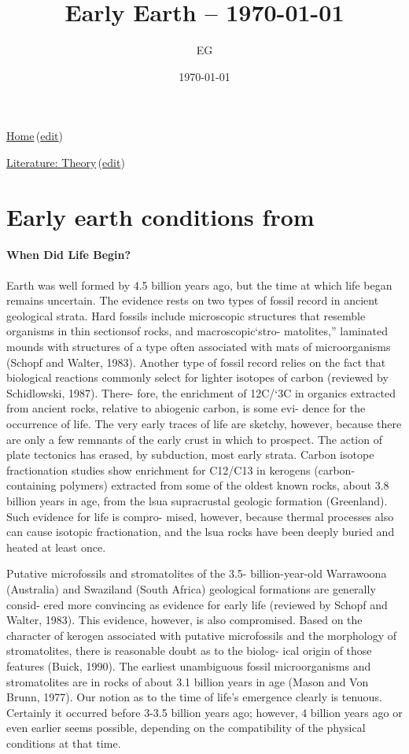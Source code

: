 \documentclass[12pt]{paper}
\title{Early Earth -- \today}
\author{EG}
\date{\today}
\newcommand{\wikilink}[2] { \href{#1.pdf}{#2}\,(\href{#1.tex}{edit})}
\begin{document}
 \maketitle
\wikilink{home}{Home}

\wikilink{literature\_theory}{Literature: Theory}

\section{Early earth conditions from  \cite{Pace1991}}
\paragraph{When Did Life Begin?}
Earth was well formed by 4.5 billion years ago, but the time
 at which life began remains uncertain. The evidence rests
on two types of fossil record in ancient geological strata.
Hard fossils include microscopic structures that resemble
organisms in thin sectionsof rocks, and macroscopic‘stro-
matolites,” laminated mounds with structures of a type
often associated with mats of microorganisms (Schopf and
Walter, 1983). Another type of fossil record relies on the
fact that biological reactions commonly select for lighter
isotopes of carbon (reviewed by Schidlowski, 1987). There-
fore, the enrichment of 12C/‘3C in organics extracted from
ancient rocks, relative to abiogenic carbon, is some evi-
dence for the occurrence of life. The very early traces of
life are sketchy, however, because there are only a few
remnants of the early crust in which to prospect. The action
of plate tectonics has erased, by subduction, most early
strata. 
Carbon isotope fractionation studies show enrichment for C12/C13 in kerogens (carbon-containing
 polymers)
extracted from some of the oldest known rocks, about 3.8
billion years in age, from the lsua supracrustal geologic
formation (Greenland). Such evidence for life is compro-
mised, however, because thermal processes also can
cause isotopic fractionation, and the lsua rocks have been
deeply buried and heated at least once.



Putative microfossils and stromatolites  of the 3.5-
billion-year-old
 Warrawoona
 (Australia) and Swaziland
(South Africa) geological formations are generally consid-
ered more convincing as evidence for early life (reviewed
by Schopf and Walter, 1983). This evidence, however, is
also compromised.
 Based on the character of kerogen associated with putative microfossils and the morphology
of stromatolites, there is reasonable doubt as to the biolog-
ical origin of those features (Buick, 1990). The earliest
unambiguous fossil microorganisms and stromatolites are
in rocks of about 3.1 billion years in age (Mason and Von
Brunn, 1977). Our notion as to the time of life’s emergence
clearly is tenuous. Certainly it occurred before 3-3.5 billion
years ago; however, 4 billion years ago or even earlier
seems possible, depending on the compatibility of the
physical conditions at that time.
\end{document}
